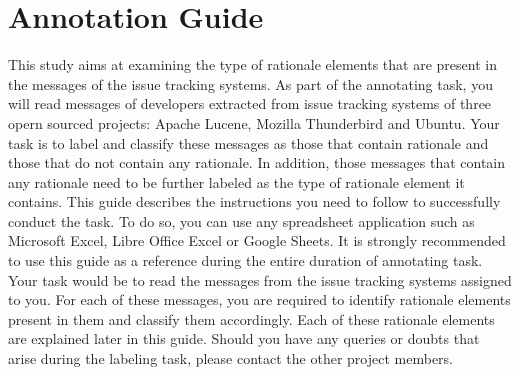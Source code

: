 \documentclass[a4paper,12pt,twoside]{report}
\begin{document}
\appendix

\chapter{Annotation Guide}
This study aims at examining the type of rationale elements that are present in the messages of the issue tracking systems.
\bigbreak 
As part of the annotating task, you will read messages of developers extracted from issue tracking systems of three opern sourced projects: Apache Lucene, Mozilla Thunderbird and Ubuntu. Your task is to label and classify these messages as those that contain rationale and those that do not contain any rationale. In addition, those messages that contain any rationale need to be further labeled as the type of rationale element it contains. 
\bigbreak
This guide describes the instructions you need to follow to successfully conduct the task. To do so, you can use any spreadsheet application such as Microsoft Excel, Libre Office Excel or Google Sheets. It is strongly recommended to use this guide as a reference during the entire duration of annotating task. 
\bigbreak
Your task would be to read the messages from the issue tracking systems assigned to you. For each of these messages, you are required to identify rationale elements present in them and classify them accordingly. Each of these rationale elements are explained later in this guide. 
\bigbreak
Should you have any queries or doubts that arise during the labeling task, please contact the other project members. 
\end{document}
